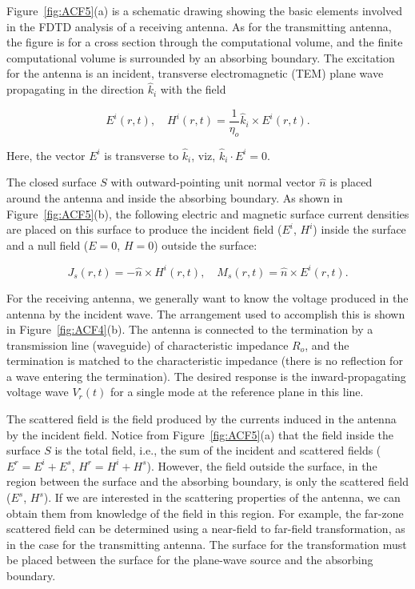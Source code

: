 Figure~\ref{fig:ACF5}(a) is a schematic drawing showing the basic elements involved in the FDTD analysis of a receiving antenna.  As for the transmitting antenna, the figure is for a cross section through the computational volume, and the finite computational volume is surrounded by an absorbing boundary.  The excitation for the antenna is an incident, transverse electromagnetic (TEM) plane wave propagating in the direction $\hat{k}_i$ with the field

\begin{equation}
E^i(r,t), \quad H^i(r,t) = \frac{1}{\eta_o}\hat{k}_i \times E^i(r,t) .
\label{eqn:ACE9}
\end{equation}

\noindent Here, the vector $E^i$ is transverse to $\hat{k}_i$, viz, $\hat{k}_i \cdot E^i = 0$.

The closed surface $S$ with outward-pointing unit normal vector $\hat{n}$ is placed around the antenna and inside the absorbing boundary.  As shown in Figure~\ref{fig:ACF5}(b), the following electric and magnetic surface current densities are placed on this surface to produce the incident field ($E^i$, $H^i$) inside the surface and a null field ($E=0$, $H=0$) outside the surface:

\begin{equation}
J_s(r,t) =-\hat{n}\times H^i(r,t),  \quad M_s(r,t)=\hat{n}\times E^i(r,t) .
\label{eqn:ACE10}
\end{equation}

For the receiving antenna, we generally want to know the voltage produced in the antenna by the incident wave.  The arrangement used to accomplish this is shown in Figure~\ref{fig:ACF4}(b).  The antenna is connected to the termination by a transmission line (waveguide) of characteristic impedance $R_o$, and the termination is matched to the characteristic impedance (there is no reflection for a wave entering the termination).  The desired response is the inward-propagating voltage wave $V^\text{-}_r(t)$ for a single mode at the reference plane in this line.

The scattered field is the field produced by the currents induced in the antenna by the incident field.  Notice from Figure~\ref{fig:ACF5}(a) that the field inside the surface $S$ is the total field, i.e., the sum of the incident and scattered fields ($E^r=E^i+E^s$, $H^r=H^i+H^s$).  However, the field outside the surface, in the region between the surface and the absorbing boundary, is only the scattered field ($E^s$, $H^s$).  If we are interested in the scattering properties of the antenna, we can obtain them from knowledge of the field in this region.  For example, the far-zone scattered field can be determined using a near-field to far-field transformation, as in the case for the transmitting antenna.  The surface for the transformation must be placed between the surface for the plane-wave source and the absorbing boundary.

